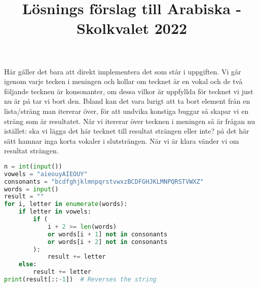 \documentclass{article}
\title{Lösnings förslag till Arabiska - Skolkvalet 2022}
\begin{document}
\maketitle
Här gäller det bara att direkt implementera det som står i uppgiften. Vi går igenom varje tecken i meningen och kollar om tecknet är en vokal och de två följande tecknen är konsonanter, om dessa vilkor är uppfyllda för tecknet vi just nu är på tar vi bort den. Ibland kan det vara lurigt att ta bort element från en lista/sträng man itererar över, för att undvika konstiga buggar så skapar vi en sträng som är resultatet. När vi itererar över tecknen i meningen så är frågan nu istället: ska vi lägga det här tecknet till resultat strängen eller inte? på det här sätt hamnar inga korta vokaler i slutsträngen. När vi är klara vänder vi om resultat strängen. 
\begin{lstlisting}[language=Python, caption=En lösning i python]
n = int(input())
vowels = "aieouyAIEOUY"
consonants = "bcdfghjklmnpqrstvwxzBCDFGHJKLMNPQRSTVWXZ"
words = input()
result = ""
for i, letter in enumerate(words):
    if letter in vowels:
        if (
            i + 2 >= len(words)
            or words[i + 1] not in consonants
            or words[i + 2] not in consonants
        ):
            result += letter
    else:
        result += letter
print(result[::-1])  # Reverses the string
\end{lstlisting}
\end{document}
